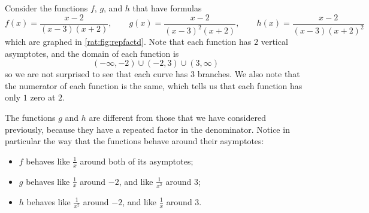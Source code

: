 	 \begin{pccexample}
		 Consider the functions $f$, $g$, and $h$ that have formulas
		 \[
			 f(x)=\frac{x-2}{(x-3)(x+2)}, \qquad g(x)=\frac{x-2}{(x-3)^2(x+2)}, \qquad h(x)=\frac{x-2}{(x-3)(x+2)^2}
		 \]
		 which are graphed in \cref{rat:fig:repfactd}. Note that each function has $2$
		 vertical asymptotes, and the domain of each function is
		 \[
			 (-\infty,-2)\cup(-2,3)\cup(3,\infty)
		 \]
		 so we are not surprised to see that each curve has $3$ branches. We also note that
		 the numerator of each function is the same, which tells us that each function has
		 only $1$ zero at $2$.

		 The functions $g$ and $h$ are different from those that we have considered previously,
		 because they have a repeated factor in the denominator. Notice in particular
		 the way that the functions behave around their asymptotes:
		 \begin{itemize}
			 \item $f$ behaves like $\frac{1}{x}$ around both of its asymptotes;
			 \item $g$ behaves like $\frac{1}{x}$ around $-2$, and like $\frac{1}{x^2}$ around $3$;
			 \item $h$ behaves like $\frac{1}{x^2}$ around $-2$, and like $\frac{1}{x}$ around $3$.
		 \end{itemize}
	 \end{pccexample}
